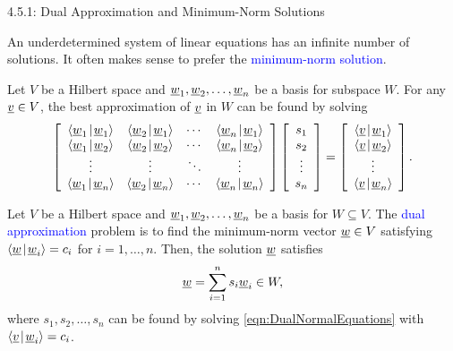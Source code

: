 \documentclass[10pt,english,aspectratio=169]{beamer}
\begin{document}
\begin{frame}{4.5.1: Dual Approximation and Minimum-Norm Solutions}

An underdetermined system of linear equations has an infinite number of solutions.
It often makes sense to prefer the \textcolor{blue}{minimum-norm solution}.

\vspace{1.5mm}

Let $V$ be a Hilbert space and $\underline{w}_1 ,\underline{w}_2 , \ldots, \underline{w}_n$ be a basis for subspace $W$.
For any $\underline{v} \in V$, the best approximation of $\underline{v}$ in $W$ can be found by solving
\begin{equation} \label{eqn:DualNormalEquations}
\left[ \begin{array}{cccc}
{\left\langle  \underline{w}_1  \mskip2mu \middle| \mskip2mu  \underline{w}_1  \right\rangle}
& {\left\langle  \underline{w}_2  \mskip2mu \middle| \mskip2mu  \underline{w}_1  \right\rangle} & \cdots
& {\left\langle  \underline{w}_n  \mskip2mu \middle| \mskip2mu  \underline{w}_1  \right\rangle} \\
{\left\langle  \underline{w}_1  \mskip2mu \middle| \mskip2mu  \underline{w}_2  \right\rangle}
& {\left\langle  \underline{w}_2  \mskip2mu \middle| \mskip2mu  \underline{w}_2  \right\rangle} & \cdots
& {\left\langle  \underline{w}_n  \mskip2mu \middle| \mskip2mu  \underline{w}_2  \right\rangle} \\
\vdots & \vdots & \ddots & \vdots \\
{\left\langle  \underline{w}_1  \mskip2mu \middle| \mskip2mu  \underline{w}_n  \right\rangle}
& {\left\langle  \underline{w}_2  \mskip2mu \middle| \mskip2mu  \underline{w}_n  \right\rangle} & \cdots
& {\left\langle  \underline{w}_n  \mskip2mu \middle| \mskip2mu  \underline{w}_n  \right\rangle}
\end{array} \right]
\left[ \begin{array}{c}
s_1 \\ s_2 \\ \vdots \\ s_n \end{array} \right]
= \left[ \begin{array}{c}
{\left\langle  \underline{v}  \mskip2mu \middle| \mskip2mu  \underline{w}_1  \right\rangle} \\
{\left\langle  \underline{v}  \mskip2mu \middle| \mskip2mu  \underline{w}_2  \right\rangle} \\ \vdots \\
{\left\langle  \underline{v}  \mskip2mu \middle| \mskip2mu  \underline{w}_n  \right\rangle} \end{array} \right] .
\end{equation}

\vspace{-1mm}

\begin{theorem}
Let $V$ be a Hilbert space and $\underline{w}_1 ,\underline{w}_2 , \ldots, \underline{w}_n$ be a basis for $W\subseteq V$.
The \textcolor{blue}{dual approximation} problem is to find the minimum-norm vector $\underline{w}\in V$ satisfying ${\left\langle  \underline{w}  \mskip2mu \middle| \mskip2mu  \underline{w}_i  \right\rangle} = c_i$ for $i=1,\ldots,n$.
Then, the solution $\underline{w}$ satisfies \vspace{-3mm}
\[ \vecnot{w} = \sum_{i=1}^n s_i \vecnot{w}_i \in W, \vspace{-2.75mm} \]
where $s_1,s_2,\ldots,s_n$ can be found by solving \eqref{eqn:DualNormalEquations} with ${\left\langle  \underline{v}  \mskip2mu \middle| \mskip2mu  \underline{w}_i  \right\rangle} = c_i$.
\end{theorem}

\end{frame}
\end{document}
